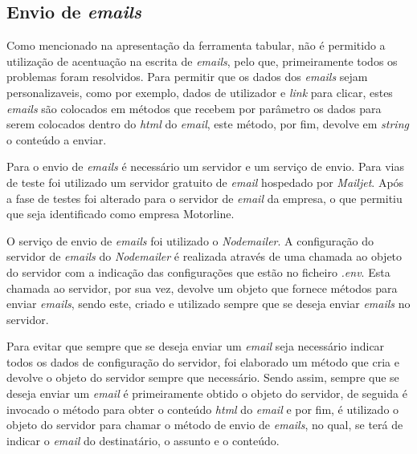 \subsection{Envio de \textit{emails}}
Como mencionado na apresentação da ferramenta tabular, não é permitido a utilização de acentuação na escrita de \textit{emails}, pelo que, primeiramente todos os problemas foram resolvidos. Para permitir que os dados dos \textit{emails} sejam personalizaveis, como por exemplo, dados de utilizador e \textit{link} para clicar, estes \textit{emails} são colocados em métodos que recebem por parâmetro os dados para serem colocados dentro do \textit{html} do \textit{email}, este método, por fim, devolve em \textit{string} o conteúdo a enviar.

Para o envio de \textit{emails} é necessário um servidor e um serviço de envio. Para vias de teste foi utilizado um servidor gratuito de \textit{email} hospedado por \textit{Mailjet}. Após a fase de testes foi alterado para o servidor de \textit{email} da empresa, o que permitiu que seja identificado como empresa Motorline.

O serviço de envio de \textit{emails} foi utilizado o \textit{Nodemailer}. A configuração do servidor de \textit{emails} do \textit{Nodemailer} é realizada através de uma chamada ao objeto do servidor com a indicação das configurações que estão no ficheiro \textit{.env}. Esta chamada ao servidor, por sua vez, devolve um objeto que fornece métodos para enviar \textit{emails}, sendo este, criado e utilizado sempre que se deseja enviar \textit{emails} no servidor.

Para evitar que sempre que se deseja enviar um \textit{email} seja necessário indicar todos os dados de configuração do servidor, foi elaborado um método que cria e devolve o objeto do servidor sempre que necessário. Sendo assim, sempre que se deseja enviar um \textit{email} é primeiramente obtido o objeto do servidor, de seguida é invocado o método para obter o conteúdo \textit{html} do \textit{email} e por fim, é utilizado o objeto do servidor para chamar o método de envio de \textit{emails}, no qual, se terá de indicar o \textit{email} do destinatário, o assunto e o conteúdo.

